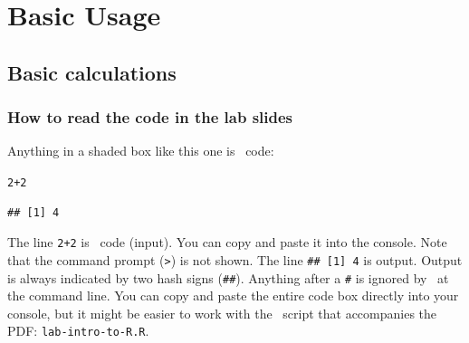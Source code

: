 \documentclass[color=usenames,dvipsnames]{beamer}\usepackage[]{graphicx}\usepackage[]{color}
\makeatletter
\newcommand{\hlnum}[1]{\textcolor[rgb]{0.69,0.494,0}{#1}}%
\newcommand{\hlopt}[1]{\textcolor[rgb]{0,0,0}{#1}}%
\newenvironment{kframe}{%
 \def\at@end@of@kframe{}%
 \ifinner\ifhmode%
  \def\at@end@of@kframe{\end{minipage}}%
  \begin{minipage}{\columnwidth}%
 \fi\fi%
 \def\FrameCommand##1{\hskip\@totalleftmargin \hskip-\fboxsep
 \colorbox{shadecolor}{##1}\hskip-\fboxsep
     \hskip-\linewidth \hskip-\@totalleftmargin \hskip\columnwidth}%
 \MakeFramed {\advance\hsize-\width
   \@totalleftmargin\z@ \linewidth\hsize
   \@setminipage}}%
 {\par\unskip\endMakeFramed%
 \at@end@of@kframe}
\newenvironment{knitrout}{}{} %
\newcommand{\inr}[1]{\colorbox{inlinecolor}{\texttt{#1}}}
\makeatother
\begin{document}
\section{Basic Usage}





\subsection{Basic calculations}




\begin{frame}[fragile]
  \frametitle{How to read the code in the lab slides}
  Anything in a shaded box like this one is \R~code:
\begin{knitrout}
\color{fgcolor}\begin{kframe}
\begin{alltt}
\hlnum{2}\hlopt{+}\hlnum{2}
\end{alltt}
\begin{verbatim}
## [1] 4
\end{verbatim}
\end{kframe}
\end{knitrout}
\pause %
  The line \inr{2+2} is \R~code (\alert{input}). You can copy
  and paste it into the console. Note that the command prompt (\verb+>+) is
  not shown.
\vfill
  The line \inr{\#\# [1] 4} is \alert{output}. Output is
  always indicated by two hash signs (\texttt{\#\#}). Anything after a
  \texttt{\#} is ignored by \R~at the command line.
\pause \vfill
  You can copy and paste the entire code box directly into your
  console, but it might be easier to work with the \R~script
  that accompanies the PDF: %
  \texttt{lab-intro-to-R.R}.
\end{frame}
\end{document}
